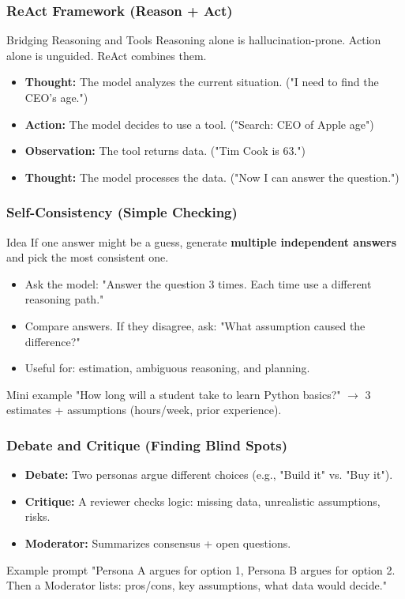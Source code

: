 \documentclass{beamer}
\begin{document}
\begin{frame}
    \frametitle{ReAct Framework (Reason + Act)}
    \begin{block}{Bridging Reasoning and Tools}
        Reasoning alone is hallucination-prone. Action alone is unguided. ReAct combines them.
    \end{block}
    \begin{itemize}
        \item \textbf{Thought:} The model analyzes the current situation. ("I need to find the CEO's age.")
        \item \textbf{Action:} The model decides to use a tool. ("Search: CEO of Apple age")
        \item \textbf{Observation:} The tool returns data. ("Tim Cook is 63.")
        \item \textbf{Thought:} The model processes the data. ("Now I can answer the question.")
    \end{itemize}
\end{frame}

\begin{frame}
    \frametitle{Self-Consistency (Simple Checking)}
    \begin{block}{Idea}
        If one answer might be a guess, generate \textbf{multiple independent answers} and pick the most consistent one.
    \end{block}
    \begin{itemize}
        \item Ask the model: "Answer the question 3 times. Each time use a different reasoning path." 
        \item Compare answers. If they disagree, ask: "What assumption caused the difference?"
        \item Useful for: estimation, ambiguous reasoning, and planning.
    \end{itemize}
    \begin{block}{Mini example}
        "How long will a student take to learn Python basics?" $\to$ 3 estimates + assumptions (hours/week, prior experience).
    \end{block}
\end{frame}

\begin{frame}
    \frametitle{Debate and Critique (Finding Blind Spots)}
    \begin{itemize}
        \item \textbf{Debate:} Two personas argue different choices (e.g., "Build it" vs. "Buy it").
        \item \textbf{Critique:} A reviewer checks logic: missing data, unrealistic assumptions, risks.
        \item \textbf{Moderator:} Summarizes consensus + open questions.
    \end{itemize}
    \begin{block}{Example prompt}
        "Persona A argues for option 1, Persona B argues for option 2.
        Then a Moderator lists: pros/cons, key assumptions, what data would decide." 
    \end{block}
\end{frame}
\end{document}
